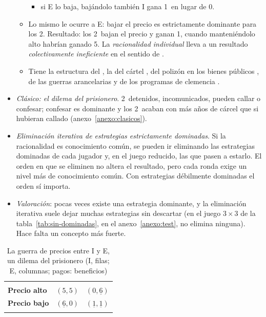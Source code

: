 \documentclass[11pt]{article}
\begin{document}
\begin{itemize}
\begin{itemize}
\begin{itemize}
    \item si E lo baja, bajándolo también \textup{I} gana 1~en lugar de 0.
    \end{itemize}
  \item Lo mismo le ocurre a E: bajar el precio es estrictamente dominante para los 2. Resultado: los 2~bajan el precio y ganan 1, cuando manteniéndolo alto habrían ganado 5. La \emph{racionalidad individual} lleva a un resultado \emph{colectivamente ineficiente} en el sentido de .
  \item Tiene la estructura del , la del cártel , del polizón en los bienes públicos , de las guerras arancelarias  y de los programas de clemencia .
  \end{itemize}
\item \emph{Clásico: el dilema del prisionero}\nocite{Tucker1950TwoPerson}. 2~detenidos, incomunicados, pueden callar o confesar; confesar es dominante y los 2~acaban con más años de cárcel que si hubieran callado (anexo~\ref{anexo:clasicos}).
\item \emph{Eliminación iterativa de estrategias estrictamente dominadas}. Si la racionalidad es conocimiento común, se pueden ir eliminando las estrategias dominadas de cada jugador y, en el juego reducido, las que pasen a estarlo. El orden en que se eliminen no altera el resultado, pero cada ronda exige un nivel más de conocimiento común. Con estrategias débilmente dominadas el orden sí importa.
\item \emph{Valoración}: pocas veces existe una estrategia dominante, y la eliminación iterativa suele dejar muchas estrategias sin descartar (en el juego $3\times3$ de la tabla~\ref{tab:sin-dominadas}, en el anexo~\ref{anexo:test}, no elimina ninguna). Hace falta un concepto más fuerte.
\end{itemize}

\begin{table}[H]
\centering
\caption{La guerra de precios entre I y E, un dilema del prisionero (\textup{I}, filas; E, columnas; pagos: beneficios)}\label{tab:dilema-prisionero}
\begin{tabular}{>{\centering\arraybackslash}m{2.4cm}|>{\centering\arraybackslash}m{2.6cm}|>{\centering\arraybackslash}m{2.6cm}|}
\multicolumn{1}{c}{} & \multicolumn{1}{c}{\textbf{Precio alto}} & \multicolumn{1}{c}{\textbf{Precio bajo}}\\
\hhline{~|-|-|}
\textbf{Precio alto} & $(5,5)$ & $(0,\underline{6})$\\
\hhline{~|-|-|}
\textbf{Precio bajo} & $(\underline{6},0)$ & \cellcolor{tceesalvia}$(\underline{1},\underline{1})$\\
\hhline{~|-|-|}
\end{tabular}
\end{table}
\end{document}
